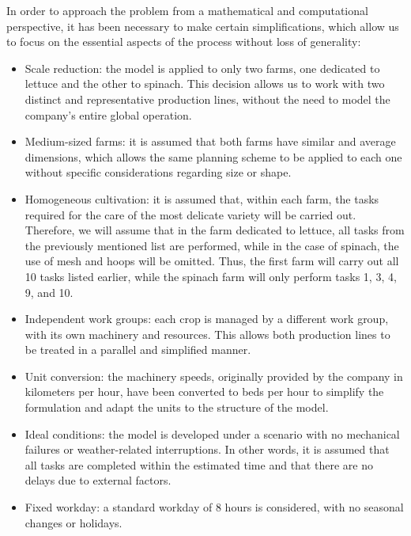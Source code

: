 In order to approach the problem from a mathematical and computational perspective, 
it has been necessary to make certain simplifications, which allow us to focus on the essential aspects of the process without loss of generality:
\begin{itemize}
    \item Scale reduction: the model is applied to only two farms, one dedicated to lettuce and the other to spinach.  
	This decision allows us to work with two distinct and representative production lines, without the need to model the company's entire global operation.
	
	\item Medium-sized farms: it is assumed that both farms have similar and average dimensions, which allows the same planning scheme to be applied  
	to each one without specific considerations regarding size or shape.
	\item Homogeneous cultivation: it is assumed that, within each farm, the tasks required for the care of the most delicate variety will be carried out.  
	Therefore, we will assume that in the farm dedicated to lettuce, all tasks from the previously mentioned list are performed, while in the case of spinach, the use of mesh and hoops will be omitted.  
	Thus, the first farm will carry out all 10 tasks listed earlier, while the spinach farm will only perform tasks 1, 3, 4, 9, and 10.
	
	\item Independent work groups: each crop is managed by a different work group, with its own machinery and resources.  
	This allows both production lines to be treated in a parallel and simplified manner.
	
	\item Unit conversion: the machinery speeds, originally provided by the company in kilometers per hour, have been converted to beds per hour  
	to simplify the formulation and adapt the units to the structure of the model.
	
	\item Ideal conditions: the model is developed under a scenario with no mechanical failures or weather-related interruptions.  
	In other words, it is assumed that all tasks are completed within the estimated time and that there are no delays due to external factors.
	
	\item Fixed workday: a standard workday of 8 hours is considered, with no seasonal changes or holidays.
\end{itemize}
 
